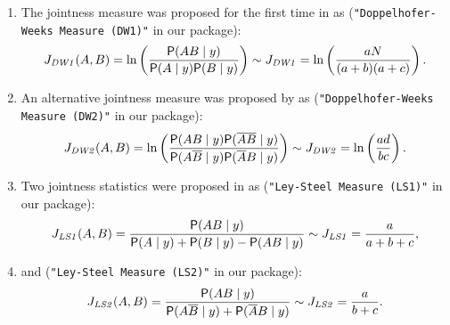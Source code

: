 \label{sec:jointess_numbers}\begin{enumerate}
	\item The jointness measure was proposed for the first
		time in \cite{DoppelhoferWeeks2005} as
		(\lstinline!"Doppelhofer-Weeks Measure (DW1)"!
		in our package):
		\begin{equation}
			J_{\mathit{DW1}}(A,B) = \ln\left(\frac{\mathsf{P}(AB\mid y)}
			{\mathsf{P}(A\mid y) \mathsf{P}(B\mid y)}\right)\sim
			J_{\mathit{DW1}} = \ln\left(\frac{aN}{(a+b)(a+c)}\right).
			\label{DW_jointness1}
		\end{equation}
	\item An alternative jointness measure was proposed by
		\cite{DoppelhoferWeeks2009} as
		(\lstinline!"Doppelhofer-Weeks Measure (DW2)"!
		in our package):
		\begin{equation}
			J_{\mathit{DW2}}(A,B) =
			\ln\left(\frac {\mathsf{P}(AB \mid y)\mathsf{P}(\overline{A}\overline{B} \mid y)}
			{\mathsf{P}(A\overline{B}\mid y)\mathsf{P}(\overline{A}B\mid y)}\right)\sim
			J_{\mathit{DW2}} = \ln\left(\frac{ad}{bc}\right).
			\label{DW_jointness2}
		\end{equation}
	\item Two jointness statistics were proposed
		in \cite{LeySteel2007} as
		(\lstinline!"Ley-Steel Measure (LS1)"! in our package):
		\begin{equation}
			J_{\mathit{LS1}}(A,B) =
			\frac{\mathsf{P}(AB\mid y)}{\mathsf{P}(A\mid y)+\mathsf{P}(B\mid y)-\mathsf{P}(AB\mid y)}
			\sim J_{\mathit{LS1}} = \frac{a}{a+b+c},
			\label{LS_jointness1}
		\end{equation}
	\item and (\lstinline!"Ley-Steel Measure (LS2)"! in our package):
	\begin{equation}
		J_{\mathit{LS2}}(A,B) =
		\frac{\mathsf{P}(AB\mid y)}{\mathsf{P}(A\overline{B}\mid y)+\mathsf{P}(\overline{A}B\mid y)}
		\sim J_{\mathit{LS2}} = \frac{a}{b+c}.
		\label{LS_jointness2}
	\end{equation}

\end{enumerate}
